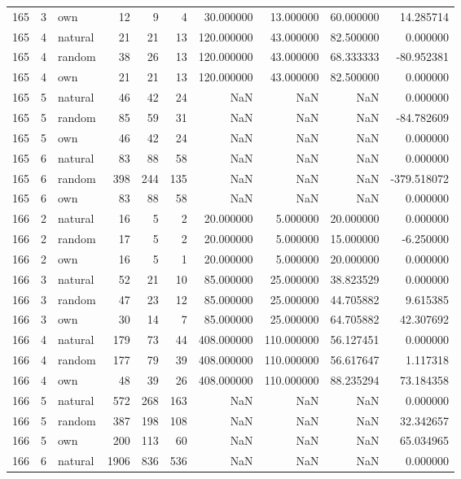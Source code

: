 \begin{table}[htbp]
\begin{tabular}{rrlrrrrrrr}
165 & 3 & own & 12 & 9 & 4 & 30.000000 & 13.000000 & 60.000000 & 14.285714 \\
165 & 4 & natural & 21 & 21 & 13 & 120.000000 & 43.000000 & 82.500000 & 0.000000 \\
165 & 4 & random & 38 & 26 & 13 & 120.000000 & 43.000000 & 68.333333 & -80.952381 \\
165 & 4 & own & 21 & 21 & 13 & 120.000000 & 43.000000 & 82.500000 & 0.000000 \\
165 & 5 & natural & 46 & 42 & 24 & NaN & NaN & NaN & 0.000000 \\
165 & 5 & random & 85 & 59 & 31 & NaN & NaN & NaN & -84.782609 \\
165 & 5 & own & 46 & 42 & 24 & NaN & NaN & NaN & 0.000000 \\
165 & 6 & natural & 83 & 88 & 58 & NaN & NaN & NaN & 0.000000 \\
165 & 6 & random & 398 & 244 & 135 & NaN & NaN & NaN & -379.518072 \\
165 & 6 & own & 83 & 88 & 58 & NaN & NaN & NaN & 0.000000 \\
166 & 2 & natural & 16 & 5 & 2 & 20.000000 & 5.000000 & 20.000000 & 0.000000 \\
166 & 2 & random & 17 & 5 & 2 & 20.000000 & 5.000000 & 15.000000 & -6.250000 \\
166 & 2 & own & 16 & 5 & 1 & 20.000000 & 5.000000 & 20.000000 & 0.000000 \\
166 & 3 & natural & 52 & 21 & 10 & 85.000000 & 25.000000 & 38.823529 & 0.000000 \\
166 & 3 & random & 47 & 23 & 12 & 85.000000 & 25.000000 & 44.705882 & 9.615385 \\
166 & 3 & own & 30 & 14 & 7 & 85.000000 & 25.000000 & 64.705882 & 42.307692 \\
166 & 4 & natural & 179 & 73 & 44 & 408.000000 & 110.000000 & 56.127451 & 0.000000 \\
166 & 4 & random & 177 & 79 & 39 & 408.000000 & 110.000000 & 56.617647 & 1.117318 \\
166 & 4 & own & 48 & 39 & 26 & 408.000000 & 110.000000 & 88.235294 & 73.184358 \\
166 & 5 & natural & 572 & 268 & 163 & NaN & NaN & NaN & 0.000000 \\
166 & 5 & random & 387 & 198 & 108 & NaN & NaN & NaN & 32.342657 \\
166 & 5 & own & 200 & 113 & 60 & NaN & NaN & NaN & 65.034965 \\
166 & 6 & natural & 1906 & 836 & 536 & NaN & NaN & NaN & 0.000000 \\

\end{tabular}
\end{table}

